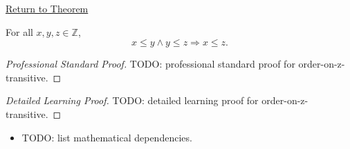\newpage
{}
\label{prf:order-on-z-transitive}

\begin{remark*}[Return]
\hyperref[thm:order-on-z-transitive]{Return to Theorem}
\end{remark*}

\begin{theorem*}
For all $x,y,z\in\mathbb{Z}$,
\[
x\le y\land y\le z \Longrightarrow x\le z.
\]
\end{theorem*}

\begin{proof}[Professional Standard Proof]
\LRAProofBodyStart
TODO: professional standard proof for order-on-z-transitive.
\end{proof}

\begin{proof}[Detailed Learning Proof]
\LRAProofBodyStart
TODO: detailed learning proof for order-on-z-transitive.
\end{proof}

\begin{remark*}
\end{remark*}

\begin{dependencies}
\begin{itemize}
  \item TODO: list mathematical dependencies.
\end{itemize}
\end{dependencies}

\clearpage
